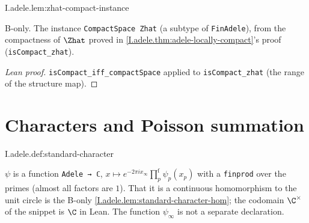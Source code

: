 \begin{lemma}
\bonly
{}
\end{lemma}
\begin{tfformal}{I.adele.lem:zhat-compact-instance}
\begin{tffidelity}
B-only. The instance \texttt{CompactSpace Zhat} (a subtype of \texttt{FinAdele}), from the compactness of $\Zhat$ proved in \cref{I.adele.thm:adele-locally-compact}'s proof (\texttt{isCompact\_zhat}).
\end{tffidelity}
\end{tfformal}
\begin{proof}[Lean proof]
\texttt{isCompact\_iff\_compactSpace} applied to \texttt{isCompact\_zhat} (the range of the structure map).
\end{proof}

\section{Characters and Poisson summation}
\begin{definition}
\end{definition}
\begin{tfformal}{I.adele.def:standard-character}
\begin{tffidelity}
$\psi$ is a function \texttt{Adele → ℂ}, $x\mapsto e^{-2\pi ix_\infty}\prod^{\mathrm f}_p\psi_p(x_p)$ with a \texttt{finprod} over the primes (almost all factors are $1$). That it is a continuous homomorphism to the unit circle is the B-only \cref{I.adele.lem:standard-character-hom}; the codomain $\C^\times$ of the snippet is $\C$ in Lean. The function $\psi_\infty$ is not a separate declaration.
\end{tffidelity}
\end{tfformal}

